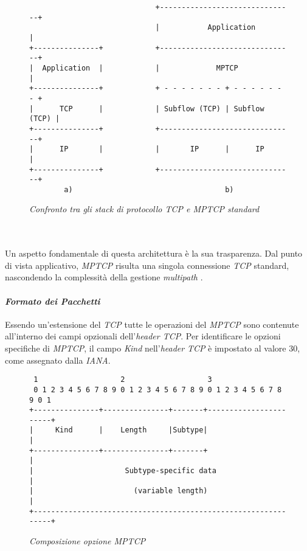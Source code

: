\begin{figure}[!h]
  \centering
    \begin{BVerbatim}
                             +-------------------------------+
                             |           Application         |
+---------------+            +-------------------------------+
|  Application  |            |             MPTCP             |
+---------------+            + - - - - - - - + - - - - - - - +
|      TCP      |            | Subflow (TCP) | Subflow (TCP) |
+---------------+            +-------------------------------+
|      IP       |            |       IP      |      IP       |
+---------------+            +-------------------------------+
        a)                                   b)
               \end{BVerbatim}
    \caption{\emph{Confronto tra gli stack di protocollo TCP e MPTCP standard}}
    \label{comparison}
    
    \end{figure}
\\\\
\noindent Un aspetto fondamentale di questa architettura è la sua trasparenza. Dal punto di vista applicativo, \emph{MPTCP} risulta una singola connessione \emph{TCP} standard, nascondendo la complessità della gestione \emph{multipath} \cite{site:mptcp-design}.
\paragraph{\textit{Formato dei Pacchetti}}
\noindent Essendo un'estensione del \emph{TCP} tutte le operazioni del \emph{MPTCP} sono contenute all'interno dei campi opzionali dell'\emph{header TCP}. 
Per identificare le opzioni specifiche di \emph{MPTCP}, il campo \emph{Kind} nell'\emph{header} \emph{TCP} è impostato al valore 30, come assegnato dalla \emph{\gls*{IANA}{}}.
\begin{figure}[!h]
    \centering
          \begin{BVerbatim}
 1                   2                   3
 0 1 2 3 4 5 6 7 8 9 0 1 2 3 4 5 6 7 8 9 0 1 2 3 4 5 6 7 8 9 0 1
+---------------+---------------+-------+-----------------------+
|     Kind      |    Length     |Subtype|                       |
+---------------+---------------+-------+                       |
|                     Subtype-specific data                     |
|                       (variable length)                       |
+---------------------------------------------------------------+   
        \end{BVerbatim}
    \caption{\emph{Composizione opzione MPTCP}}
    \label{mptcp-option-format}
\end{figure}

